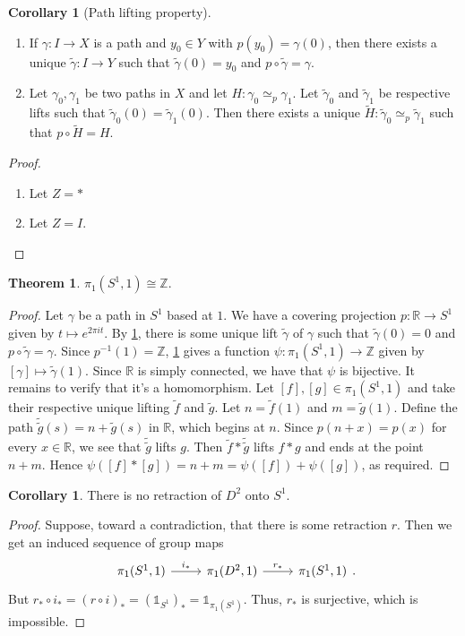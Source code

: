 \documentclass[10pt,letterpaper,cm]{nupset}
\theoremstyle{definition}
\theoremstyle{theorem}
\newtheorem{theorem}[definition]{Theorem}
\newtheorem{corollary}[definition]{Corollary}
\theoremstyle{remark}
\newcommand{\R}{\mathbb{R}}
\newcommand{\Z}{\mathbb Z}
\newcommand{\1}{\mathbb{1}}
\newcommand{\0}{\vec 0}
\begin{document}
\begin{corollary}[Path lifting property]\label{cor1} $ $
\begin{enumerate}
\item If $\gamma : I \to X$ is a path and $y_0 \in Y$ with $p(y_0) = \gamma(0)$, then there exists a unique $\tilde{\gamma} : I \to Y$ such that $\tilde{\gamma}(0) = y_0$ and $p \circ \tilde{\gamma} = \gamma$.
\item Let $\gamma_0, \gamma_1$ be two paths in $X$ and let $H : \gamma_0 \simeq_p \gamma_1$. Let $\tilde{\gamma}_0$ and $\tilde{\gamma}_1$ be respective lifts such that $\tilde{\gamma}_0 (0) = \tilde{\gamma}_1(0)$. Then there exists a unique $\widetilde{H} : \tilde{\gamma}_0 \simeq_p \tilde{\gamma}_1$ such that $p \circ \widetilde{H} = H$.
\end{enumerate}
\end{corollary}
\begin{proof} $ $
\begin{enumerate}
\item Let $Z = \ast$
\item Let $Z = I$.
\end{enumerate}
\end{proof}

\begin{theorem}
$\pi_1(S^1, 1) \cong \Z$.
\end{theorem}
\begin{proof}
Let $\gamma$ be a path in $S^1$ based at $1$. We have a covering projection $p: \R \to S^1$ given by $t\mapsto e^{2\pi i t}$. By \cref{cor1}, there is some unique lift $\tilde{\gamma}$ of $\gamma$ such that $\tilde{\gamma}(0) = 0$ and $p \circ \tilde{\gamma} = \gamma$. Since $p^{-1}(1) = \Z$, \cref{cor1} gives a function $\psi: \pi_1(S^1, 1) \to \Z$ given by $\left[\gamma \right] \mapsto \tilde{\gamma}(1)$. Since $\R$ is simply connected, we have that $\psi$ is bijective. It remains to verify that it's a homomorphism. Let $[f], [g] \in \pi_1(S^1, 1)$ and take their respective unique lifting $\tilde{f}$ and $\tilde{g}$. Let $n = \tilde{f}(1)$ and $m= \tilde{g}(1)$. Define the path $\tilde{\tilde{g}}(s) = n+ \tilde{g}(s)$ in $\R$, which begins at $n$. Since $p(n+x) = p(x)$ for every $x\in \R$, we see that $\tilde{\tilde{g}}$ lifts $g$. Then $\tilde{f} \ast \tilde{\tilde{g}}$ lifts $f \ast g$ and ends at the point $n+m$. Hence $\psi([f] \ast [g]) = n+m = \psi([f])  + \psi([g])$, as required. 
\end{proof}


\begin{corollary}
There is no retraction of $D^2$ onto $S^1$.
\end{corollary}
\begin{proof}
Suppose, toward a contradiction, that there is some retraction $r$. Then we get an induced sequence of group maps
\[
\begin{tikzcd}
{\pi_1(S^1, 1)} \arrow[r, "i_{\ast}"] & {\pi_1(D^2, 1)} \arrow[r, "r_{\ast}"] & {\pi_1(S^1, 1)}
\end{tikzcd}
.\] But $r_{\ast} \circ i_{\ast} = \left(r \circ i\right)_{\ast} = \left(\1_{S^1}\right)_{\ast} = \1_{\pi_1(S^1)}$. Thus, $r_{\ast}$ is surjective, which is impossible. 
\end{proof}
\end{document}
